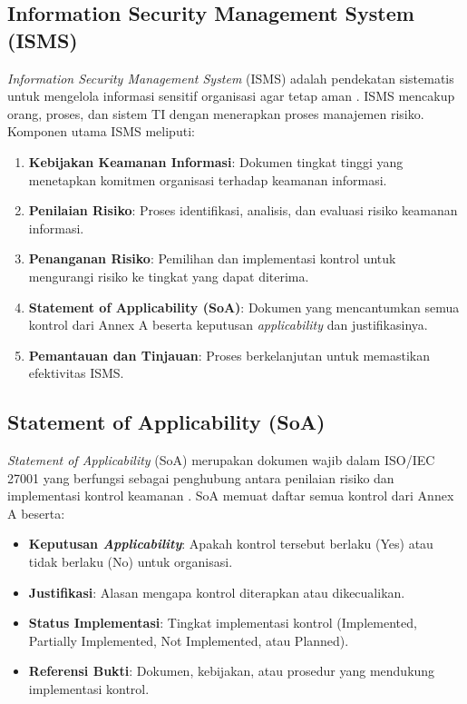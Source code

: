 \documentclass[bachelor,bahasa]{thesisdtetiugm}
\begin{document}
\subsection{Information Security Management System (ISMS)}

\textit{Information Security Management System} (ISMS) adalah pendekatan sistematis untuk mengelola informasi sensitif organisasi agar tetap aman \cite{iso27001review2022}. ISMS mencakup orang, proses, dan sistem TI dengan menerapkan proses manajemen risiko. Komponen utama ISMS meliputi:

\begin{enumerate}
	\item \textbf{Kebijakan Keamanan Informasi}: Dokumen tingkat tinggi yang menetapkan komitmen organisasi terhadap keamanan informasi.
	\item \textbf{Penilaian Risiko}: Proses identifikasi, analisis, dan evaluasi risiko keamanan informasi.
	\item \textbf{Penanganan Risiko}: Pemilihan dan implementasi kontrol untuk mengurangi risiko ke tingkat yang dapat diterima.
	\item \textbf{Statement of Applicability (SoA)}: Dokumen yang mencantumkan semua kontrol dari Annex A beserta keputusan \textit{applicability} dan justifikasinya.
	\item \textbf{Pemantauan dan Tinjauan}: Proses berkelanjutan untuk memastikan efektivitas ISMS.
\end{enumerate}

\subsection{Statement of Applicability (SoA)}

\textit{Statement of Applicability} (SoA) merupakan dokumen wajib dalam ISO/IEC 27001 yang berfungsi sebagai penghubung antara penilaian risiko dan implementasi kontrol keamanan \cite{iso27001review2022}. SoA memuat daftar semua kontrol dari Annex A beserta:

\begin{itemize}
	\item \textbf{Keputusan \textit{Applicability}}: Apakah kontrol tersebut berlaku (Yes) atau tidak berlaku (No) untuk organisasi.
	\item \textbf{Justifikasi}: Alasan mengapa kontrol diterapkan atau dikecualikan.
	\item \textbf{Status Implementasi}: Tingkat implementasi kontrol (Implemented, Partially Implemented, Not Implemented, atau Planned).
	\item \textbf{Referensi Bukti}: Dokumen, kebijakan, atau prosedur yang mendukung implementasi kontrol.
\end{itemize}
\end{document}
